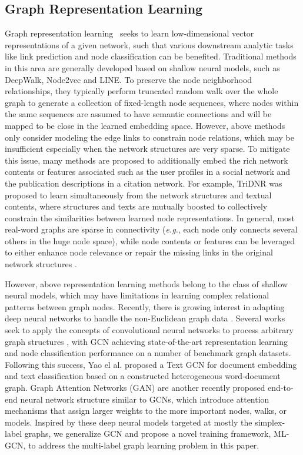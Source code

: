 \documentclass[conference]{IEEEtran}
\begin{document}
\subsection{Graph Representation Learning}
Graph representation learning~\cite{zhang2018network, wu2019comprehensive} seeks to learn low-dimensional vector representations of a given network, such that various downstream analytic tasks like link prediction and node classification can be benefited. Traditional methods in this area are generally developed based on shallow neural models, such as DeepWalk\cite{21}, Node2vec\cite{26} and LINE\cite{24}. To preserve the node neighborhood relationships, they typically perform truncated random walk over the whole graph to generate a collection of fixed-length node sequences, where nodes within the same sequences are assumed to have semantic connections and will be mapped to be close in the learned embedding space. However, above methods only consider modeling the edge links to constrain node relations, which may be insufficient especially when the network structures are very sparse. To mitigate this issue, many methods \cite{3, yang2015network} are proposed to additionally embed the rich network contents or features associated such as the user profiles in a social network and the publication descriptions in a citation network. For example, TriDNR \cite{pan2016tri} was proposed to learn simultaneously from the network structures and textual contents, where structures and texts are mutually boosted to collectively constrain the similarities between learned node representations. In general, most real-word graphs are sparse in connectivity (\textit{e.g.}, each node only connects several others in the huge node space), while node contents or features can be leveraged to either enhance node relevance or repair the missing links in the original network structures \cite{le2014probabilistic}.

However, above representation learning methods belong to the class of shallow neural models, which may have limitations in learning complex relational patterns between graph nodes. Recently, there is growing interest in adapting deep neural networks to handle the non-Euclidean graph data \cite{11,22}. Several works seek to apply the concepts of convolutional neural networks to process arbitrary graph structures \cite{14,24}, with GCN \cite{14} achieving state-of-the-art representation learning and node classification performance on a number of benchmark graph datasets. Following this success, Yao el al. \cite{25} proposed a Text GCN for document embedding and text classification based on a constructed heterogeneous word-document graph. Graph Attention Networks (GAN) \cite{11} are another recently proposed end-to-end neural network structure similar to GCNs, which introduce attention mechanisms that assign larger weights to the more important nodes, walks, or models. Inspired by these deep neural models targeted at mostly the simplex-label graphs, we generalize GCN and propose a novel training framework, ML-GCN, to address the multi-label graph learning problem in this paper.
\end{document}
